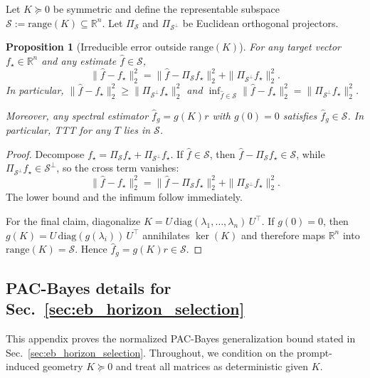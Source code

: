 \documentclass{article}
\theoremstyle{plain}
\newtheorem{proposition}[theorem]{Proposition}
\theoremstyle{definition}
\theoremstyle{remark}
\begin{document}
Let $K\succeq 0$ be symmetric and define the representable subspace $\mathcal{S}:=\mathrm{range}(K)\subseteq\mathbb{R}^n$.
Let $\Pi_{\mathcal{S}}$ and $\Pi_{\mathcal{S}^\perp}$ be Euclidean orthogonal projectors.

\begin{proposition}[Irreducible error outside $\mathrm{range}(K)$]
\label{prop:app_subspace_separation}
For any target vector $f_\star\in\mathbb{R}^n$ and any estimate $\hat f\in\mathcal{S}$,
\begin{equation}
\|\hat f-f_\star\|_2^2
=
\|\hat f-\Pi_{\mathcal{S}} f_\star\|_2^2
+
\|\Pi_{\mathcal{S}^\perp} f_\star\|_2^2.
\label{eq:app_subspace_pythagorean}
\end{equation}
In particular, $\|\hat f-f_\star\|_2^2\ge \|\Pi_{\mathcal{S}^\perp} f_\star\|_2^2$ and
$\inf_{\hat f\in\mathcal{S}}\|\hat f-f_\star\|_2^2=\|\Pi_{\mathcal{S}^\perp} f_\star\|_2^2$.

Moreover, any spectral estimator $\hat f_g=g(K)r$ with $g(0)=0$ satisfies $\hat f_g\in\mathcal{S}$. In particular, TTT for any $T$ lies in $\mathcal{S}$.
\end{proposition}

\begin{proof}
Decompose $f_\star=\Pi_{\mathcal{S}}f_\star+\Pi_{\mathcal{S}^\perp}f_\star$.
If $\hat f\in\mathcal{S}$, then $\hat f-\Pi_{\mathcal{S}}f_\star\in\mathcal{S}$, while
$\Pi_{\mathcal{S}^\perp}f_\star\in\mathcal{S}^\perp$, so the cross term vanishes:
\[
\|\hat f-f_\star\|_2^2
=
\|\hat f-\Pi_{\mathcal{S}}f_\star\|_2^2
+
\|\Pi_{\mathcal{S}^\perp}f_\star\|_2^2.
\]
The lower bound and the infimum follow immediately.

For the final claim, diagonalize $K=U\,\mathrm{diag}(\lambda_1,\dots,\lambda_n)\,U^\top$.
If $g(0)=0$, then $g(K)=U\,\mathrm{diag}(g(\lambda_i))\,U^\top$ annihilates $\ker(K)$ and therefore maps
$\mathbb{R}^n$ into $\mathrm{range}(K)=\mathcal{S}$. Hence $\hat f_g=g(K)r\in\mathcal{S}$.
\end{proof}



\subsection{PAC-Bayes details for Sec.~\ref{sec:eb_horizon_selection}}
\label{app:pac_horizon_selection}

This appendix proves the normalized PAC-Bayes generalization bound stated in
Sec.~\ref{sec:eb_horizon_selection}.
Throughout, we condition on the prompt-induced geometry $K\succeq 0$ and treat all matrices as deterministic given $K$.
\end{document}
